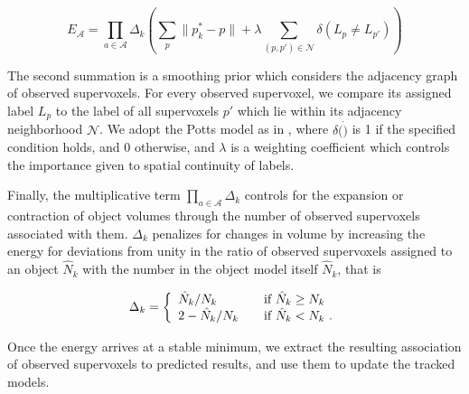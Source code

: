 \begin{equation}
\label{eqn:Energy}
{E}_\mathcal{A} =\prod_{a\in\mathcal{A}}{\Delta_k} \left( \sum_{p}{\|p^*_k - p\|} + \lambda \sum_{(p,p')\in \mathcal{N} }\delta(L_p \not= L_{p'}) \right) 
\end{equation}

The second summation is a smoothing prior which considers the adjacency graph of observed supervoxels. For every observed supervoxel, we compare its assigned label $L_p$ to the label of all supervoxels $p'$ which lie within its adjacency neighborhood $\mathcal{N}$. We adopt the Potts model as in \cite{Boykov2001}, where $\delta(\dot)$ is 1 if the specified condition holds, and 0 otherwise, and $\lambda$ is a weighting coefficient which controls the importance given to spatial continuity of labels.

Finally, the multiplicative term $\prod_{a\in\mathcal{A}}{\Delta_k}$ controls for the expansion or contraction of object volumes through the number of observed supervoxels associated with them. $\Delta_k$ penalizes for changes in volume by increasing the energy for deviations from unity in the ratio of observed supervoxels assigned to an object $\hat{N}_k$ with the number in the object model itself $\hat{N}_k$, that is

\begin{equation}
\label{eqn:DeltaSVs}
\Delta_k = \left\{ 
  \begin{array}{l l}
    {\hat{N}_k}/{N_k} & \quad \text{if ${\hat{N}_k} \geq {{N}_k}$ }\\
    2 - {\hat{N}_k}/{N_k} & \quad \text{if $\hat{N}_k < {N}_k$}~. 
  \end{array} \right.  
\end{equation}

Once the energy arrives at a stable minimum, we extract the resulting association of observed supervoxels to predicted results, and use them to update the tracked models.

